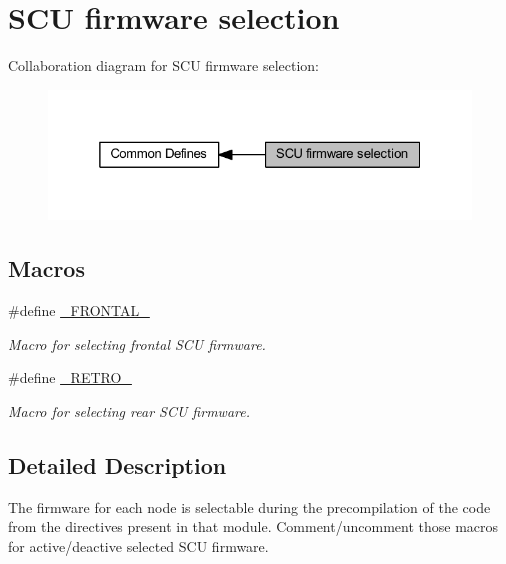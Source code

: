 \hypertarget{group___s_c_u__firmware__selection}{}\section{S\+CU firmware selection}
\label{group___s_c_u__firmware__selection}
Collaboration diagram for S\+CU firmware selection\+:\nopagebreak
\begin{figure}[H]
\begin{center}
\leavevmode
\includegraphics[width=325pt]{group___s_c_u__firmware__selection}
\end{center}
\end{figure}
\subsection*{Macros}
\begin{DoxyCompactItemize}
\item 
\mbox{\label{group___s_c_u__firmware__selection_gac03ca83c43ea664674af7e07a8da7879}} 
\#define \mbox{\hyperlink{group___s_c_u__firmware__selection_gac03ca83c43ea664674af7e07a8da7879}{\+\_\+\+F\+R\+O\+N\+T\+A\+L\+\_\+}}
\begin{DoxyCompactList}\small\item\em Macro for selecting frontal S\+CU firmware. \end{DoxyCompactList}\item 
\mbox{\label{group___s_c_u__firmware__selection_ga790010e78c29a0a2ffa3c09cc62d9f3d}} 
\#define \mbox{\hyperlink{group___s_c_u__firmware__selection_ga790010e78c29a0a2ffa3c09cc62d9f3d}{\+\_\+\+R\+E\+T\+R\+O\+\_\+}}
\begin{DoxyCompactList}\small\item\em Macro for selecting rear S\+CU firmware. \end{DoxyCompactList}\end{DoxyCompactItemize}


\subsection{Detailed Description}
The firmware for each node is selectable during the precompilation of the code from the directives present in that module. Comment/uncomment those macros for active/deactive selected S\+CU firmware. 